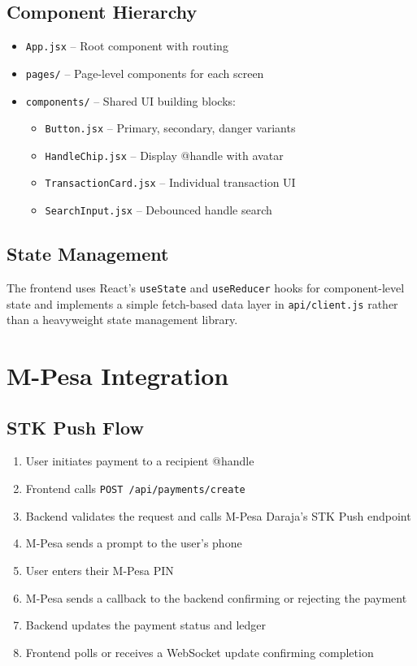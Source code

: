 \documentclass[12pt, a4paper, twoside, openright]{report}
\begin{document}
\subsection{Component Hierarchy}

\begin{itemize}
    \item \texttt{App.jsx} -- Root component with routing
    \item \texttt{pages/} -- Page-level components for each screen
    \item \texttt{components/} -- Shared UI building blocks:
    \begin{itemize}
        \item \texttt{Button.jsx} -- Primary, secondary, danger variants
        \item \texttt{HandleChip.jsx} -- Display @handle with avatar
        \item \texttt{TransactionCard.jsx} -- Individual transaction UI
        \item \texttt{SearchInput.jsx} -- Debounced handle search
    \end{itemize}
\end{itemize}

\subsection{State Management}

The frontend uses React's \texttt{useState} and \texttt{useReducer} hooks for component-level state and implements a simple fetch-based data layer in \texttt{api/client.js} rather than a heavyweight state management library.

\section{M-Pesa Integration}

\subsection{STK Push Flow}

\begin{enumerate}
    \item User initiates payment to a recipient @handle
    \item Frontend calls \texttt{POST /api/payments/create}
    \item Backend validates the request and calls M-Pesa Daraja's STK Push endpoint
    \item M-Pesa sends a prompt to the user's phone
    \item User enters their M-Pesa PIN
    \item M-Pesa sends a callback to the backend confirming or rejecting the payment
    \item Backend updates the payment status and ledger
    \item Frontend polls or receives a WebSocket update confirming completion
\end{enumerate}
\end{document}
